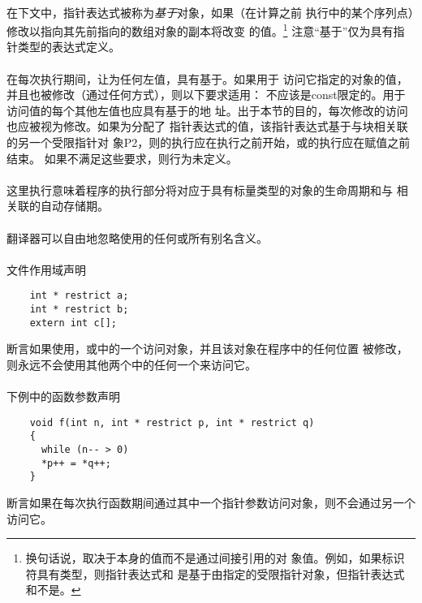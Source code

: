 \paragraph{}
在下文中，指针表达式被称为\textit{基于}对象，如果（在计算之前
执行中的某个序列点）修改以指向其先前指向的数组对象的副本将改变
的值。\footnote{换句话说，取决于本身的值而不是通过间接引用的对
象值。例如，如果标识符具有类型，则指针表达式和
是基于由指定的受限指针对象，但指针表达式和不是。}
注意``基于''仅为具有指针类型的表达式定义。

\paragraph{}
在每次执行期间，让为任何左值，具有基于。如果用于
访问它指定的对象的值，并且也被修改（通过任何方式），则以下要求适用：
不应该是const限定的。用于访问值的每个其他左值也应具有基于的地
址。出于本节的目的，每次修改的访问也应被视为修改。如果为分配了
指针表达式的值，该指针表达式基于与块相关联的另一个受限指针对
象{P2}，则的执行应在执行之前开始，或的执行应在赋值之前结束。
如果不满足这些要求，则行为未定义。

\paragraph{}
这里执行意味着程序的执行部分将对应于具有标量类型的对象的生命周期和与
相关联的自动存储期。

\paragraph{}
翻译器可以自由地忽略使用的任何或所有别名含义。

\paragraph{}
\ex 文件作用域声明
\begin{lstlisting}
    int * restrict a;
    int * restrict b;
    extern int c[];
\end{lstlisting}
断言如果使用，或中的一个访问对象，并且该对象在程序中的任何位置
被修改，则永远不会使用其他两个中的任何一个来访问它。

\paragraph{}
\ex 下例中的函数参数声明
\begin{lstlisting}
    void f(int n, int * restrict p, int * restrict q)
    {
      while (n-- > 0)
      *p++ = *q++;
    }
\end{lstlisting}
断言如果在每次执行函数期间通过其中一个指针参数访问对象，则不会通过另一个访问它。

